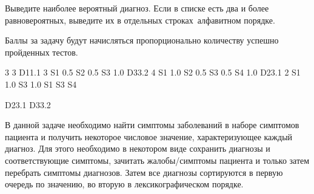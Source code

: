 \outputfmtSection

Выведите наиболее вероятный диагноз. Если в списке есть два и более равновероятных, выведите их в отдельных строках алфавитном порядке.

\markSection

Баллы за задачу будут начисляться пропорционально количеству успешно пройденных тестов.


\begin{myverbbox}[\small]{\vinput}
    3 3
    D11.1 3
    S1 0.5
    S2 0.5
    S3 1.0
    D33.2 4
    S1 1.0
    S2 0.5
    S3 0.5
    S4 1.0
    D23.1 2
    S1 1.0
    S3 1.0
    S1 S3 S4
\end{myverbbox}
\begin{myverbbox}[\small]{\voutput}
    D23.1
    D33.2
\end{myverbbox}

\solutionSection

В данной задаче необходимо найти симптомы заболеваний в наборе симптомов пациента и получить некоторое числовое значение, характеризующее каждый диагноз. Для этого необходимо в некотором виде сохранить диагнозы и соответствующие симптомы, зачитать жалобы/симптомы пациента и только затем перебрать симптомы диагнозов. Затем все диагнозы сортируются в первую очередь по значению, во вторую в лексикографическом порядке.

